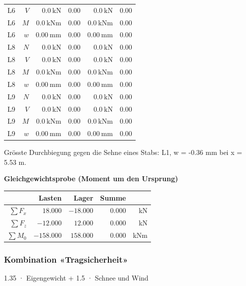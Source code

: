 \documentclass[11pt,a4paper]{article}
\begin{document}
\begin{longtable}{rrrrrr}
L6 & $V$ & $0.0\ \mathrm{kN}$ & $0.00$ & $0.0\ \mathrm{kN}$ & $0.00$ \\
L6 & $M$ & $0.0\ \mathrm{kNm}$ & $0.00$ & $0.0\ \mathrm{kNm}$ & $0.00$ \\
L6 & $w$ & $0.00\ \mathrm{mm}$ & $0.00$ & $0.00\ \mathrm{mm}$ & $0.00$ \\
L8 & $N$ & $0.0\ \mathrm{kN}$ & $0.00$ & $0.0\ \mathrm{kN}$ & $0.00$ \\
L8 & $V$ & $0.0\ \mathrm{kN}$ & $0.00$ & $0.0\ \mathrm{kN}$ & $0.00$ \\
L8 & $M$ & $0.0\ \mathrm{kNm}$ & $0.00$ & $0.0\ \mathrm{kNm}$ & $0.00$ \\
L8 & $w$ & $0.00\ \mathrm{mm}$ & $0.00$ & $0.00\ \mathrm{mm}$ & $0.00$ \\
L9 & $N$ & $0.0\ \mathrm{kN}$ & $0.00$ & $0.0\ \mathrm{kN}$ & $0.00$ \\
L9 & $V$ & $0.0\ \mathrm{kN}$ & $0.00$ & $0.0\ \mathrm{kN}$ & $0.00$ \\
L9 & $M$ & $0.0\ \mathrm{kNm}$ & $0.00$ & $0.0\ \mathrm{kNm}$ & $0.00$ \\
L9 & $w$ & $0.00\ \mathrm{mm}$ & $0.00$ & $0.00\ \mathrm{mm}$ & $0.00$ \\
\hline
\end{longtable}
Grösste Durchbiegung gegen die Sehne eines Stabs: L1, w = -0.36 mm bei x = 5.53 m.

\noindent\textbf{Gleichgewichtsprobe (Moment um den Ursprung)}
\begin{longtable}{rrrrr}
\hline
 & Lasten & Lager & Summe &  \\
\hline
\endhead
$\sum F_x$ & $18.000$ & $-18.000$ & $0.000$ & kN \\
$\sum F_z$ & $-12.000$ & $12.000$ & $0.000$ & kN \\
$\sum M_0$ & $-158.000$ & $158.000$ & $0.000$ & kNm \\
\hline
\end{longtable}
\subsubsection{Kombination «Tragsicherheit»}
1.35 · Eigengewicht + 1.5 · Schnee und Wind
\end{document}
